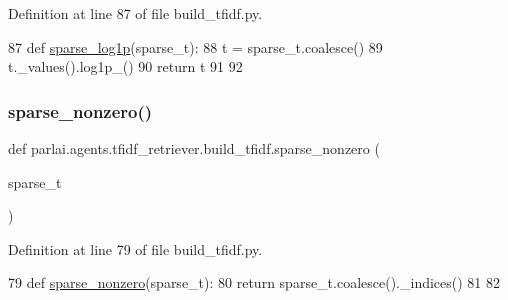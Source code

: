 Definition at line 87 of file build\+\_\+tfidf.\+py.


\begin{DoxyCode}
87 \textcolor{keyword}{def }\hyperlink{namespaceparlai_1_1agents_1_1tfidf__retriever_1_1build__tfidf_a89650718966a5b0d1114e8b06b8c0dcc}{sparse\_log1p}(sparse\_t):
88     t = sparse\_t.coalesce()
89     t.\_values().log1p\_()
90     \textcolor{keywordflow}{return} t
91 
92 
\end{DoxyCode}
\mbox{\label{namespaceparlai_1_1agents_1_1tfidf__retriever_1_1build__tfidf_a7ec5dffcb27b7ce23ea0a0e37ef2398d}} 
\subsubsection{\texorpdfstring{sparse\+\_\+nonzero()}{sparse\_nonzero()}}
{\footnotesize\ttfamily def parlai.\+agents.\+tfidf\+\_\+retriever.\+build\+\_\+tfidf.\+sparse\+\_\+nonzero (\begin{DoxyParamCaption}\item[{}]{sparse\+\_\+t }\end{DoxyParamCaption})}



Definition at line 79 of file build\+\_\+tfidf.\+py.


\begin{DoxyCode}
79 \textcolor{keyword}{def }\hyperlink{namespaceparlai_1_1agents_1_1tfidf__retriever_1_1build__tfidf_a7ec5dffcb27b7ce23ea0a0e37ef2398d}{sparse\_nonzero}(sparse\_t):
80     \textcolor{keywordflow}{return} sparse\_t.coalesce().\_indices()
81 
82 
\end{DoxyCode}
\mbox{\label{namespaceparlai_1_1agents_1_1tfidf__retriever_1_1build__tfidf_a8852c505db2852b5e39be3468a9c1733}} 
